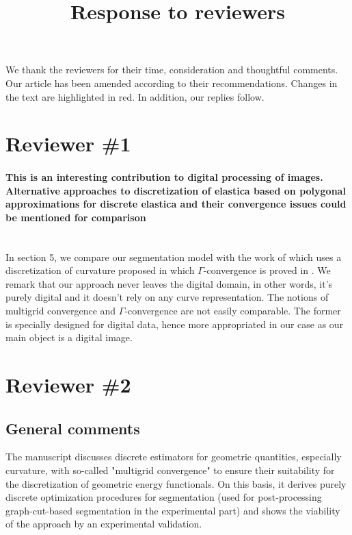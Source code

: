 \documentclass[12pt]{article}
\title{Response to reviewers}
\date{}
\begin{document}
\maketitle

We thank the reviewers for their time, consideration and thoughtful comments. Our article has been amended
according to their recommendations. Changes in the text are highlighted in red. In addition, our replies follow.

\section{Reviewer \#1}

\paragraph{This is an interesting contribution to digital processing of images. Alternative approaches to discretization of elastica based on polygonal approximations for discrete elastica and their convergence issues could be mentioned for comparison}

~\\
In section 5, we compare our segmentation model with the work of \cite{schoenemann09linear} which uses a discretization of curvature proposed in \cite{bruckstein96} which $\Gamma$-convergence is proved in \cite{bruckstein01}. We remark that our approach never leaves the digital domain, in other words, it's purely digital and it doesn't rely on any curve representation. The notions of multigrid convergence and $\Gamma$-convergence are not easily comparable. The former is specially designed for digital data, hence more appropriated in our case as our main object is a digital image.
~\\

\section{Reviewer \#2}


\subsection{General comments}
The manuscript discusses discrete estimators for geometric quantities,
especially curvature, with so-called "multigrid convergence" to ensure
their suitability for the discretization of geometric energy functionals.
On this basis, it derives purely discrete optimization procedures for
segmentation (used for post-processing graph-cut-based segmentation in the
experimental part) and shows the viability of the approach by an experimental
validation.
\end{document}
